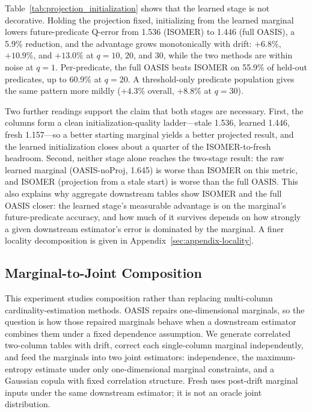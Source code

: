\documentclass[preprint,12pt]{elsarticle}
\newcommand{\oasisUseMaxWidthResize}[1]{%
  \renewcommand{\resizebox}[3]{\adjustbox{max width=#1}{##3}}%
}
\begin{document}
\begingroup
\oasisUseMaxWidthResize{.96\textwidth}

\endgroup

Table~\ref{tab:projection_initialization} shows that the learned stage is not
decorative. Holding the projection fixed, initializing from the learned marginal
lowers future-predicate Q-error from 1.536 (ISOMER) to 1.446 (full OASIS), a
5.9\% reduction, and the advantage grows monotonically with drift: $+6.8\%$,
$+10.9\%$, and $+13.0\%$ at $q=10$, $20$, and $30$, while the two methods are
within noise at $q=1$. Per-predicate, the full OASIS beats ISOMER on 55.9\% of
held-out predicates, up to 60.9\% at $q=20$. A threshold-only predicate
population gives the same pattern more mildly ($+4.3\%$ overall, $+8.8\%$ at
$q=30$).

Two further readings support the claim that both stages are necessary. First,
the columns form a clean initialization-quality ladder---stale 1.536, learned
1.446, fresh 1.157---so a better starting marginal yields a better projected
result, and the learned initialization closes about a quarter of the
ISOMER-to-fresh headroom. Second, neither stage alone reaches the two-stage
result: the raw learned marginal (OASIS-noProj, 1.645) is worse than ISOMER on
this metric, and ISOMER (projection from a stale start) is worse than the full
OASIS. This also explains why aggregate downstream tables show ISOMER and the
full OASIS closer: the learned stage's measurable advantage is on the marginal's
future-predicate accuracy, and how much of it survives depends on how strongly a
given downstream estimator's error is dominated by the marginal. A finer
locality decomposition is given in Appendix~\ref{sec:appendix-locality}.

\subsection{Marginal-to-Joint Composition}
\label{sec:marginal_joint}

This experiment studies composition rather than replacing multi-column
cardinality-estimation methods. OASIS repairs one-dimensional marginals, so the
question is how those repaired marginals behave when a downstream estimator
combines them under a fixed dependence assumption. We generate correlated
two-column tables with drift, correct each single-column marginal
independently, and feed the marginals into two joint estimators: independence,
the maximum-entropy estimate under only one-dimensional marginal constraints,
and a Gaussian copula with fixed correlation structure. Fresh uses post-drift
marginal inputs under the same downstream estimator; it is not an oracle joint
distribution.
\end{document}
